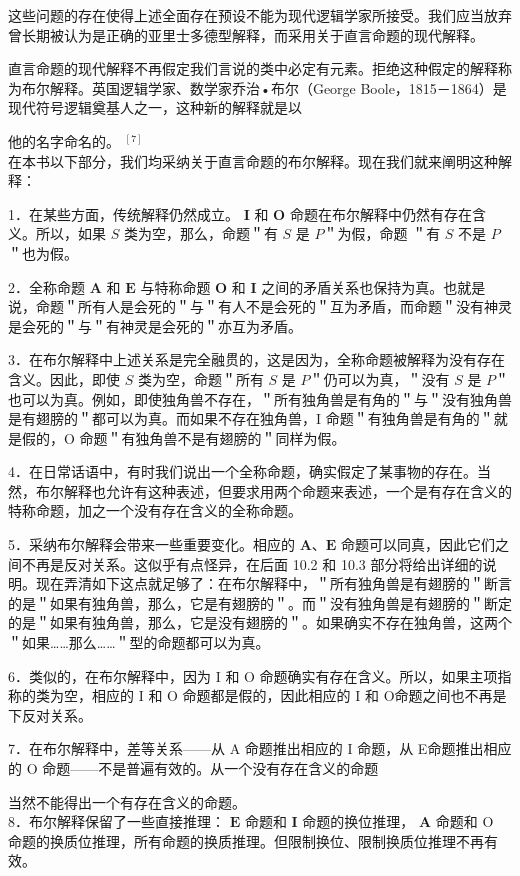 这些问题的存在使得上述全面存在预设不能为现代逻辑学家所接受。我们应当放弃曾长期被认为是正确的亚里士多德型解释，而采用关于直言命题的现代解释。

直言命题的现代解释不再假定我们言说的类中必定有元素。拒绝这种假定的解释称为布尔解释。英国逻辑学家、数学家乔治•布尔（George Boole，1815－1864）是现代符号逻辑奠基人之一，这种新的解释就是以

他的名字命名的。 ${ }^{[7]}$\\
在本书以下部分，我们均采纳关于直言命题的布尔解释。现在我们就来阐明这种解释：

1．在某些方面，传统解释仍然成立。 $\mathbf{I}$ 和 $\mathbf{O}$ 命题在布尔解释中仍然有存在含义。所以，如果 $S$ 类为空，那么，命题＂有 $S$ 是 $P$＂为假，命题 ＂有 $S$ 不是 $P$＂也为假。

2．全称命题 $\mathbf{A}$ 和 $\mathbf{E}$ 与特称命题 $\mathbf{O}$ 和 $\mathbf{I}$ 之间的矛盾关系也保持为真。也就是说，命题＂所有人是会死的＂与＂有人不是会死的＂互为矛盾，而命题＂没有神灵是会死的＂与＂有神灵是会死的＂亦互为矛盾。

3．在布尔解释中上述关系是完全融贯的，这是因为，全称命题被解释为没有存在含义。因此，即使 $S$ 类为空，命题＂所有 $S$ 是 $P$＂仍可以为真，＂没有 $S$ 是 $P$＂也可以为真。例如，即使独角兽不存在，＂所有独角兽是有角的＂与＂没有独角兽是有翅膀的＂都可以为真。而如果不存在独角兽，I 命题＂有独角兽是有角的＂就是假的，O 命题＂有独角兽不是有翅膀的＂同样为假。

4．在日常话语中，有时我们说出一个全称命题，确实假定了某事物的存在。当然，布尔解释也允许有这种表述，但要求用两个命题来表述，一个是有存在含义的特称命题，加之一个没有存在含义的全称命题。

5．采纳布尔解释会带来一些重要变化。相应的 $\mathbf{A 、 E}$ 命题可以同真，因此它们之间不再是反对关系。这似乎有点怪异，在后面 10.2 和 10.3 部分将给出详细的说明。现在弄清如下这点就足够了：在布尔解释中，＂所有独角兽是有翅膀的＂断言的是＂如果有独角兽，那么，它是有翅膀的＂。而＂没有独角兽是有翅膀的＂断定的是＂如果有独角兽，那么，它是没有翅膀的＂。如果确实不存在独角兽，这两个＂如果……那么……＂型的命题都可以为真。

6．类似的，在布尔解释中，因为 I 和 O 命题确实有存在含义。所以，如果主项指称的类为空，相应的 I 和 O 命题都是假的，因此相应的 I 和 O命题之间也不再是下反对关系。

7．在布尔解释中，差等关系——从 A 命题推出相应的 I 命题，从 E命题推出相应的 O 命题——不是普遍有效的。从一个没有存在含义的命题

当然不能得出一个有存在含义的命题。\\
8．布尔解释保留了一些直接推理： $\mathbf{E}$ 命题和 $\mathbf{I}$ 命题的换位推理， $\mathbf{A}$ 命题和 O 命题的换质位推理，所有命题的换质推理。但限制换位、限制换质位推理不再有效。

